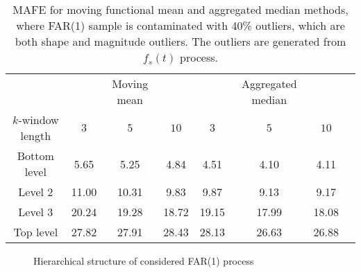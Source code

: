 \documentclass[12pt,a4paper]{article}
\numberwithin{equation}{section}
\begin{document}
\begin{table}
\caption{MAFE for moving functional mean and aggregated median methods, where FAR(1) sample is contaminated with 40\% outliers, which are both shape and magnitude outliers. The outliers are generated from $f_s(t)$ process.}
\label{tab:out40} 
\begin{center}
\begin{small}
\begin{tabular}{c|ccc|cccc}\hline
\noalign{\smallskip}
 & &Moving mean&  &  &Aggregated median&  \\
	$k$-window length& $3$ & $5$ & $10$ & $3$ &$5$ & $10$ \\\hline
	Bottom level & 5.65 & 5.25 & 4.84 & 4.51&4.10 & 4.11 \\
	Level 2 &11.00&  10.31 &9.83 & 9.87 & 9.13 & 9.17  \\
	Level 3 &20.24  &19.28& 18.72 & 19.15 & 17.99 & 18.08 \\
    Top level & 27.82 & 27.91 & 28.43 & 28.13 & 26.63 & 26.88 \\
\hline	
\end{tabular}
\end{small}
\end{center}
\end{table}
\begin{figure}
\caption{Hierarchical structure of considered FAR(1) process}
\label{fig_hier}
\end{figure}
\end{document}
